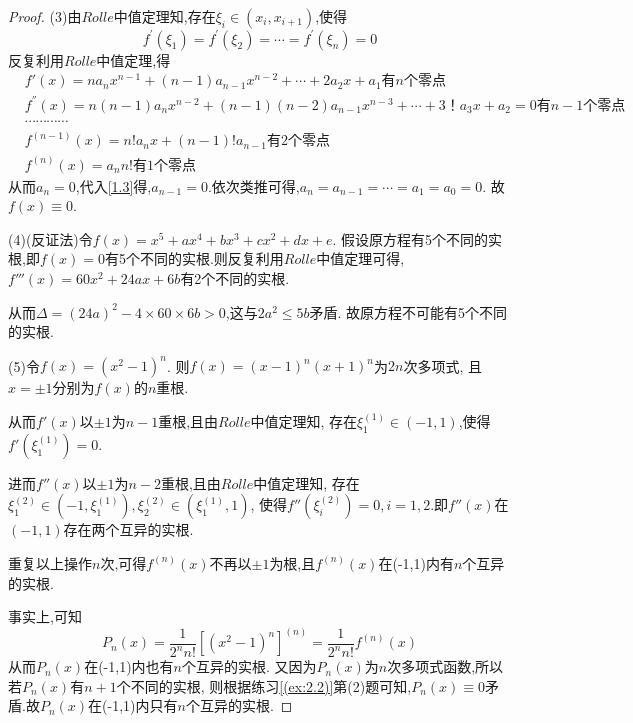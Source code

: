 \documentclass[lang=cn,newtx,10pt,scheme=chinese]{elegantbook}
\begin{document}
\begin{exercise}
\begin{proof}
    (3)由$Rolle$中值定理知,存在$\xi_i\in(x_i,x_{i+1})$,使得
    \begin{equation}
        f^{\prime}\left( \xi _1 \right) =f^{\prime}\left( \xi _2 \right) =\cdots =f^{\prime}\left( \xi _n \right) =0
        \nonumber
    \end{equation}
    反复利用$Rolle$中值定理,得
    \begin{align}
            &f'\left( x \right) =na_nx^{n-1}+\left( n-1 \right) a_{n-1}x^{n-2}+\cdots +2a_2x+a_1\text{有}n\text{个零点}
            \\
            &f^{''}(x)=n\left( n-1 \right) a_nx^{n-2}+\left( n-1 \right) \left( n-2 \right) a_{n-1}x^{n-3}+\cdots +3\text{！}a_3x+a_2=0\text{有}n-1\text{个零点}
            \\
            &\cdots \cdots \cdots \cdots \nonumber
            \\
            &f^{(n-1)}(x)=n!a_nx+\left( n-1 \right) !a_{n-1}\text{有}2\text{个零点} \label{1.3}
            \\
            &f^{(n)}(x)=a_nn!\text{有}1\text{个零点}
    \end{align}
    从而$a_n=0$,代入\eqref{1.3}得,$a_{n-1}=0$.依次类推可得,$a_n=a_{n-1}=\cdots=a_1=a_0=0$.
    故$f(x)\equiv 0$.

    (4)(反证法)令$f(x)=x^5+ax^4+bx^3+cx^2+dx+e$.
    假设原方程有5个不同的实根,即$f(x)=0$有5个不同的实根.则反复利用$Rolle$中值定理可得,
    $f'''(x)=60x^2+24ax+6b$有2个不同的实根.
    
    从而$\Delta=(24a)^2-4\times 60\times 6b>0$,这与$2a^2\le 5b$矛盾.
    故原方程不可能有5个不同的实根.

    (5)令$f(x)=\left( x^2-1 \right) ^n$.
    则$f(x)=\left( x-1 \right) ^n\left( x+1 \right) ^n$为$2n$次多项式,
    且$x=\pm1$分别为$f(x)$的$n$重根.

    从而$f'(x)$以$\pm1$为$n-1$重根,且由$Rolle$中值定理知,
    存在$\xi _{1}^{(1)}\in(-1,1)$,使得$f'(\xi _{1}^{(1)})=0$.

    进而$f''(x)$以$\pm1$为$n-2$重根,且由$Rolle$中值定理知,
    存在$\xi _{1}^{(2)}\in(-1,\xi _{1}^{(1)}),\xi _{2}^{(2)}\in(\xi _{1}^{(1)},1)$,
    使得$f''(\xi _{i}^{(2)})=0,i=1,2$.即$f''(x)$在$(-1,1)$存在两个互异的实根.

    重复以上操作$n$次,可得$f^{(n)}(x)$不再以$\pm1$为根,且$f^{(n)}(x)$在(-1,1)内有$n$个互异的实根.

    事实上,可知
    \begin{equation}
        P_n\left( x \right) =\frac{1}{2^nn!}\left[ \left( x^2-1 \right) ^n \right] ^{\left( n \right)}
        =\frac{1}{2^nn!}f^{(n)}(x)
        \nonumber
    \end{equation}
    从而$P_n(x)$在(-1,1)内也有$n$个互异的实根.
    又因为$P_n(x)$为$n$次多项式函数,所以若$P_n(x)$有$n+1$个不同的实根,
    则根据练习\eqref{(ex:2.2)}第(2)题可知,$P_n(x)\equiv 0$矛盾.故$P_n(x)$在(-1,1)内只有$n$个互异的实根.


\end{proof}
\end{exercise}
\end{document}
